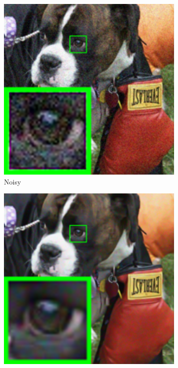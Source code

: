 \begin{figure}
    \centering
    \begin{subfigure}[t]{0.19\textwidth}
        \centering
        \includegraphics[width=1\textwidth]{images/mcwnnm/resize_br_Noisy_dog.png}
		\caption{Noisy}
    \end{subfigure}
    \hfill
    \begin{subfigure}[t]{0.19\textwidth}
        \centering
        \includegraphics[width=1\textwidth]{images/mcwnnm/resize_br_BM3D_dog.png}

\end{subfigure}
\end{figure}
